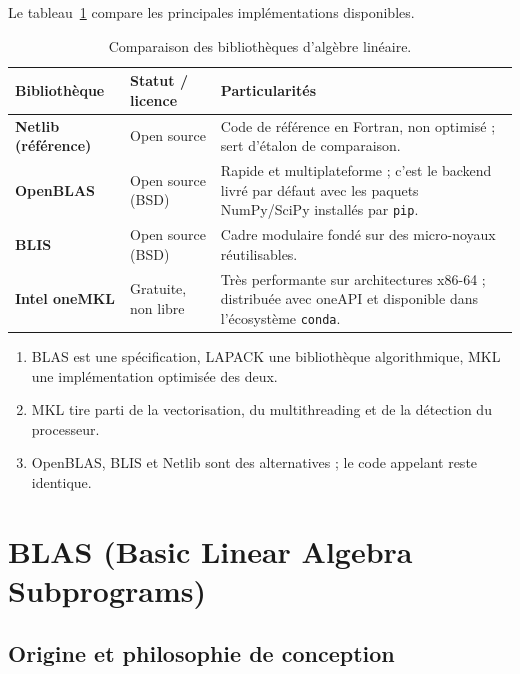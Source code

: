 \documentclass[11pt,a4paper]{report}
\theoremstyle{plain}
\theoremstyle{definition}
\theoremstyle{remark}
\begin{document}
Le tableau~\ref{tab:alternatives_mkl} compare les principales implémentations disponibles.

\begin{table}[ht]
\centering
\caption{Comparaison des bibliothèques d'algèbre linéaire.}
\label{tab:alternatives_mkl}
\begin{tabularx}{\textwidth}{l p{3.2cm} X}
\toprule
\textbf{Bibliothèque} & \textbf{Statut / licence} & \textbf{Particularités} \\
\midrule
\textbf{Netlib (référence)} & Open source & Code de référence en Fortran, non optimisé ; sert d'étalon de comparaison. \\
\textbf{OpenBLAS} & Open source (BSD) & Rapide et multiplateforme ; c'est le backend livré par défaut avec les paquets NumPy/SciPy installés par \texttt{pip}. \\
\textbf{BLIS} & Open source (BSD) & Cadre modulaire fondé sur des micro-noyaux réutilisables. \\
\textbf{Intel oneMKL} & Gratuite, non libre & Très performante sur architectures x86-64 ; distribuée avec oneAPI et disponible dans l'écosystème \texttt{conda}. \\
\bottomrule
\end{tabularx}
\end{table}

\begin{encadreresume}
\begin{enumerate}
    \item BLAS est une spécification, LAPACK une bibliothèque algorithmique, MKL une implémentation optimisée des deux.
    \item MKL tire parti de la vectorisation, du multithreading et de la détection du processeur.
    \item OpenBLAS, BLIS et Netlib sont des alternatives ; le code appelant reste identique.
\end{enumerate}
\end{encadreresume}

\chapter{BLAS (Basic Linear Algebra Subprograms)}

\section{Origine et philosophie de conception}
\end{document}
